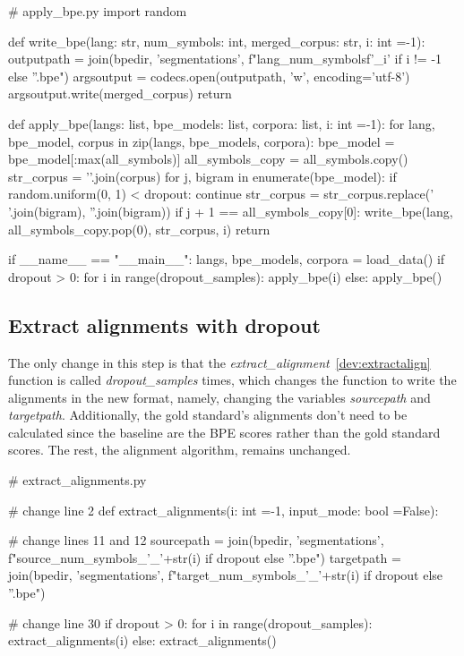 \begin{python}
# apply_bpe.py
import random

def write_bpe(lang: str, num_symbols: int, merged_corpus: str, i: int =-1):
  outputpath = join(bpedir, 'segmentations', f"{lang}_{num_symbols}{f'_{i}' if i != -1 else ''}.bpe")
  argsoutput = codecs.open(outputpath, 'w', encoding='utf-8')
  argsoutput.write(merged_corpus)
  return

def apply_bpe(langs: list, bpe_models: list, corpora: list, i: int =-1):
  for lang, bpe_model, corpus in zip(langs, bpe_models, corpora):
    bpe_model = bpe_model[:max(all_symbols)]
    all_symbols_copy = all_symbols.copy()
    str_corpus = '\n'.join(corpus)
    for j, bigram in enumerate(bpe_model):
      if random.uniform(0, 1) < dropout:
        continue
      str_corpus = str_corpus.replace(' '.join(bigram), ''.join(bigram))
      if j + 1 == all_symbols_copy[0]:
        write_bpe(lang, all_symbols_copy.pop(0), str_corpus, i)
  return

if __name__ == "__main__":
  langs, bpe_models, corpora = load_data()
  if dropout > 0:
    for i in range(dropout_samples):
      apply_bpe(i)
  else:
      apply_bpe()
\end{python}

\subsection{Extract alignments with dropout}

The only change in this step is that the \emph{extract\_alignment}~\ref{dev:extractalign} function is called \emph{dropout\_samples} times, which changes the function to write the alignments in the new format, namely, changing the variables \emph{sourcepath} and \emph{targetpath}. Additionally, the gold standard's alignments don't need to be calculated since the baseline are the BPE scores rather than the gold standard scores. The rest, the alignment algorithm, remains unchanged.

\begin{python}
# extract_alignments.py

# change line 2
def extract_alignments(i: int =-1, input_mode: bool =False):

# change lines 11 and 12
sourcepath = join(bpedir, 'segmentations', f"{source}_{num_symbols}_{'_'+str(i) if dropout else ''}.bpe")
targetpath = join(bpedir, 'segmentations', f"{target}_{num_symbols}_{'_'+str(i) if dropout else ''}.bpe")

# change line 30
if dropout > 0:
  for i in range(dropout_samples):
    extract_alignments(i)
else:
  extract_alignments()
\end{python}

